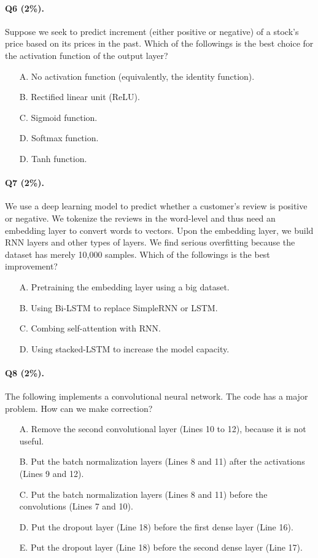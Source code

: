 \documentclass[11pt]{article}
\numberwithin{equation}{section}
\begin{document}
\paragraph{Q6 (2\%).} 
Suppose we seek to predict increment (either positive or negative) of a stock's price based on its prices in the past.
Which of the followings is the best choice for the activation function of the output layer?
\begin{itemize}
	\item[A.]
	No activation function (equivalently, the identity function).
	\item[B.]
	Rectified linear unit (ReLU).
	\item[C.]
	Sigmoid function.
	\item[D.]
	Softmax function.
	\item[D.]
	Tanh function.
\end{itemize}



\paragraph{Q7 (2\%).} 
We use a deep learning model to predict whether a customer's review is positive or negative.
We tokenize the reviews in the word-level and thus need an embedding layer to convert words to vectors.
Upon the embedding layer, we build RNN layers and other types of layers.
We find serious overfitting because the dataset has merely 10,000 samples.
Which of the followings is the best improvement?
\begin{itemize}
	\item[A.]
	Pretraining the embedding layer using a big dataset.
	\item[B.]
	Using Bi-LSTM to replace SimpleRNN or LSTM.
	\item[C.]
	Combing self-attention with RNN.
	\item[D.]
	Using stacked-LSTM to increase the model capacity.
\end{itemize}




\paragraph{Q8 (2\%).} 
The following implements a convolutional neural network.
The code has a major problem.
How can we make correction?
\begin{itemize}
	\item[A.]
	Remove the second convolutional layer (Lines 10 to 12), because it is not useful.
	\item[B.]
	Put the batch normalization layers (Lines 8 and 11) after the activations (Lines 9 and 12).
	\item[C.]
	Put the batch normalization layers (Lines 8 and 11) before the convolutions (Lines 7 and 10).
	\item[D.]
	Put the dropout layer (Line 18) before the first dense layer (Line 16).
	\item[E.]
	Put the dropout layer (Line 18) before the second dense layer (Line 17).
\end{itemize}
\end{document}
